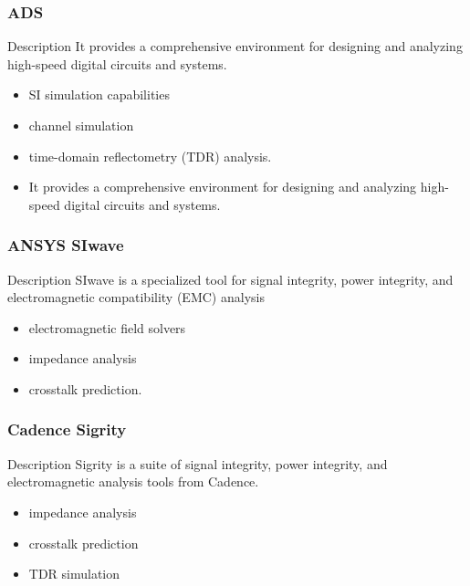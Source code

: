 \documentclass[10pt,hyperref={pdfpagemode=FullScreen},aspectratio=169]{beamer}
\begin{document}
\begin{frame}
  \frametitle{ADS}
\begin{block}{Description}
  It provides a comprehensive environment for designing and analyzing high-speed digital circuits and systems.
\end{block}
  \begin{itemize}
    \item SI simulation capabilities
    \item channel simulation
    \item time-domain reflectometry (TDR) analysis.
    \item It provides a comprehensive environment for designing and analyzing high-speed digital circuits and systems.
  \end{itemize}

\end{frame}

\begin{frame}
  \frametitle{ANSYS SIwave}

 \begin{block}{Description}
  SIwave is a specialized tool for signal integrity, power integrity, and electromagnetic compatibility (EMC) analysis
 \end{block} 

 \begin{itemize}
  \item electromagnetic field solvers
  \item impedance analysis
  \item crosstalk prediction.
 \end{itemize}

\end{frame}

\begin{frame}
  \frametitle{Cadence Sigrity}

  \begin{block}{Description}
    Sigrity is a suite of signal integrity, power integrity, and electromagnetic analysis tools from Cadence.
  \end{block}

  \begin{itemize}
    \item impedance analysis
    \item crosstalk prediction
    \item TDR simulation
  \end{itemize}

\end{frame}
\end{document}
